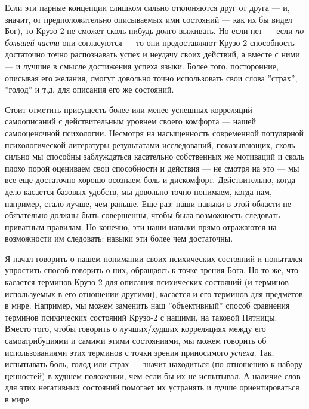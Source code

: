 \documentclass[11pt]{book}
\begin{document}
Если эти парные концепции слишком сильно отклоняются друг от друга --- и, значит, от предположительно описываемых ими состояний --- как их бы видел Бог), то Крузо-2 не сможет сколь-нибудь долго выживать. Но если нет --- если \textit{по большей части} они согласуются --- то они предоставляют Крузо-2 способность достаточно точно распознавать успех и неудачу своих действий, а вместе с ними --- и лучшие в смысле достижения успеха языки. Более того, посторонние, описывая его желания, смогут довольно точно использовать свои слова ''страх'', ''голод'' и т.д. для описания его же состояний.

Стоит отметить присущесть более или менее успешных корреляций самоописаний с действительным уровнем своего комфорта --- нашей самооценочной психологии. Несмотря на насыщенность современной популярной психологической литературы результатами исследований, показывающих, сколь сильно мы способны заблуждаться касательно собственных же мотиваций и сколь плохо порой оцениваем свои способности и действия --- не смотря на это --- мы все еще достаточно хорошо осознаем боль и дискомфорт. Действительно, когда дело касается базовых удобств, мы довольно точно понимаем, когда нам, например, стало лучше, чем раньше. Еще раз: наши навыки в этой области не обязательно должны быть совершенны, чтобы была возможность следовать приватным правилам. Но конечно, эти наши навыки прямо отражаются на возможности им следовать: навыки эти более чем достаточны.

Я начал говорить о нашем понимании своих психических состояний и попытался упростить способ говорить о них, обращаясь к точке зрения Бога. Но то же, что касается терминов Крузо-2 для описания психических состояний (и терминов используемых в его отношении другими), касается и его терминов для предметов в мире. Например, мы можем заменить наш ''объективный'' способ сравнения терминов психических состояний Крузо-2 с нашими, на таковой Пятницы. Вместо того, чтобы говорить о лучших/худших корреляциях между его самоатрибуциями и самими этими состояниями, мы можем говорить об использованиями этих терминов с точки зрения приносимого \textit{успеха}. Так, испытывать боль, голод или страх --- значит находиться (по отношению к набору ценностей) в худшем положении, чем если бы их не испытывал. А наличие слов для этих негативных состояний помогает их устранять и лучше ориентироваться в мире.
\end{document}

